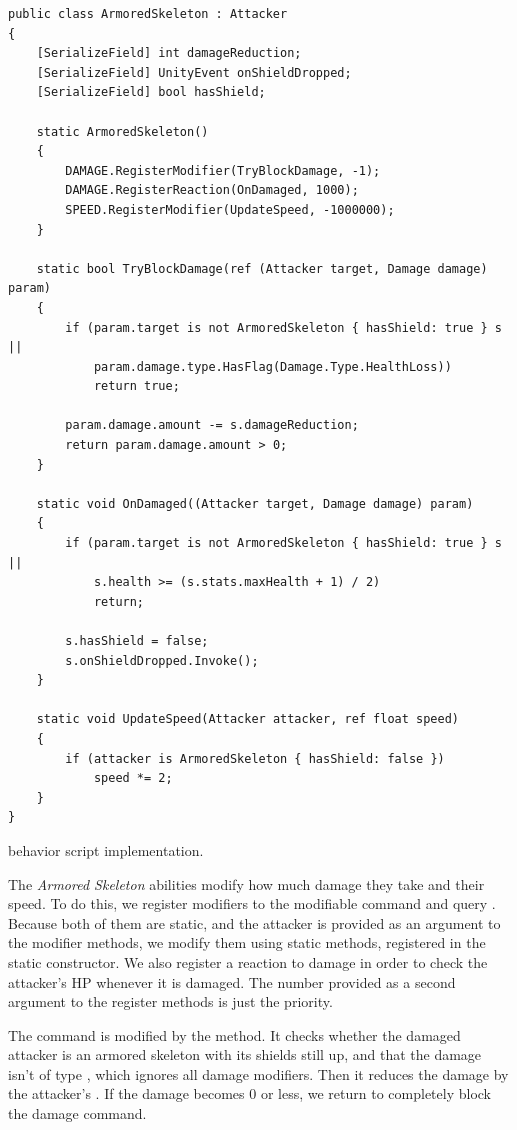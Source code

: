 \begin{listing}[H]
    \begin{verbatim}
public class ArmoredSkeleton : Attacker
{
    [SerializeField] int damageReduction;
    [SerializeField] UnityEvent onShieldDropped;
    [SerializeField] bool hasShield;

    static ArmoredSkeleton()
    {
        DAMAGE.RegisterModifier(TryBlockDamage, -1);
        DAMAGE.RegisterReaction(OnDamaged, 1000);
        SPEED.RegisterModifier(UpdateSpeed, -1000000);
    }

    static bool TryBlockDamage(ref (Attacker target, Damage damage) param)
    {
        if (param.target is not ArmoredSkeleton { hasShield: true } s ||
            param.damage.type.HasFlag(Damage.Type.HealthLoss))
            return true;

        param.damage.amount -= s.damageReduction;
        return param.damage.amount > 0;
    }

    static void OnDamaged((Attacker target, Damage damage) param)
    {
        if (param.target is not ArmoredSkeleton { hasShield: true } s ||
            s.health >= (s.stats.maxHealth + 1) / 2)
            return;

        s.hasShield = false;
        s.onShieldDropped.Invoke();
    }

    static void UpdateSpeed(Attacker attacker, ref float speed)
    {
        if (attacker is ArmoredSkeleton { hasShield: false })
            speed *= 2;
    }
}
    \end{verbatim}
    \caption{ behavior script implementation.}
    \label{code:armored-skeleton}
\end{listing}

The \emph{Armored Skeleton} abilities modify how much damage they take and their speed.
To do this, we register modifiers to the modifiable command  and query .
Because both of them are static, and the attacker is provided as an argument to the modifier methods, we modify them using static methods, registered in the  static constructor.
We also register a reaction to damage in order to check the attacker's HP whenever it is damaged.
The number provided as a second argument to the register methods is just the priority.

The command  is modified by the  method.
It checks whether the damaged attacker is an armored skeleton with its shields still up, and that the damage isn't of type , which ignores all damage modifiers.
Then it reduces the damage by the attacker's .
If the damage becomes 0 or less, we return  to completely block the damage command.

